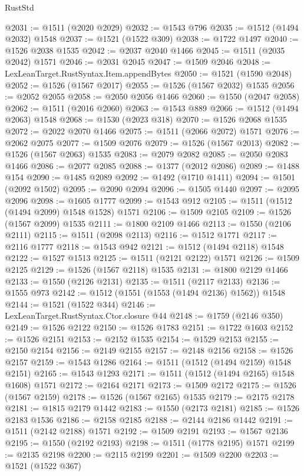 \begin{lexlean}{RustStd}
\begin{coremodule}
{{@2031 := @1511 (@2020 @2029)
@2032 := @1543 @796
@2035 := @1512 (@1494 @2032) @1548
@2037 := @1521 (@1522 @309)
@2038 := @1722 @1497
@2040 := @1526 @2038 @1535
@2042 := @2037 @2040 @1466
@2045 := @1511 (@2035 @2042) @1571
@2046 := @2031 @2045
@2047 := @1509 @2046
@2048 := LexLeanTarget.RustSyntax.Item.appendBytes
@2050 := @1521 (@1590 @2048)
@2052 := @1526 (@1567 @2017)
@2055 := @1526 (@1567 @2032) @1535
@2056 := @2052 @2055
@2058 := @2050 @2056 @1466
@2060 := @1550 (@2047 @2058)
@2062 := @1511 (@2016 @2060)
@2063 := @1543 @889
@2066 := @1512 (@1494 @2063) @1548
@2068 := @1530 (@2023 @318)
@2070 := @1526 @2068 @1535
@2072 := @2022 @2070 @1466
@2075 := @1511 (@2066 @2072) @1571
@2076 := @2062 @2075
@2077 := @1509 @2076
@2079 := @1526 (@1567 @2013)
@2082 := @1526 (@1567 @2063) @1535
@2083 := @2079 @2082
@2085 := @2050 @2083 @1466
@2086 := @2077 @2085
@2088 := @1377 (@2012 @2086)
@2089 := @1488 @154
@2090 := @1485 @2089
@2092 := @1492 (@1710 @1411)
@2094 := @1501 (@2092 @1502)
@2095 := @2090 @2094
@2096 := @1505 @1440
@2097 := @2095 @2096
@2098 := @1605 @1777
@2099 := @1543 @912
@2105 := @1511 (@1512 (@1494 @2099) @1548 @1528) @1571
@2106 := @1509 @2105
@2109 := @1526 (@1567 @2099) @1535
@2111 := @1800 @2109 @1466
@2113 := @1550 (@2106 @2111)
@2115 := @1511 (@2098 @2113)
@2116 := @1512 @1771
@2117 := @2116 @1777
@2118 := @1543 @942
@2121 := @1512 (@1494 @2118) @1548
@2122 := @1527 @1513
@2125 := @1511 (@2121 @2122) @1571
@2126 := @1509 @2125
@2129 := @1526 (@1567 @2118) @1535
@2131 := @1800 @2129 @1466
@2133 := @1550 (@2126 @2131)
@2135 := @1511 (@2117 @2133)
@2136 := @1555 @973
@2142 := @1512 (@1551 (@1553 (@1494 @2136) @1562)) @1548
@2144 := @1521 (@1522 @344)
@2146 := LexLeanTarget.RustSyntax.Ctor.closure @44
@2148 := @1759 (@2146 @350)
@2149 := @1526 @2122
@2150 := @1526 @1783
@2151 := @1722 @1603
@2152 := @1526 @2151
@2153 := @2152 @1535
@2154 := @1529 @2153
@2155 := @2150 @2154
@2156 := @2149 @2155
@2157 := @2148 @2156
@2158 := @1526 @2157
@2159 := @1543 @1286
@2164 := @1511 (@1512 (@1494 @2159) @1548 @2151)
@2165 := @1543 @1293
@2171 := @1511 (@1512 (@1494 @2165) @1548 @1608) @1571
@2172 := @2164 @2171
@2173 := @1509 @2172
@2175 := @1526 (@1567 @2159)
@2178 := @1526 (@1567 @2165) @1535
@2179 := @2175 @2178
@2181 := @1815 @2179 @1442
@2183 := @1550 (@2173 @2181)
@2185 := @1526 @2183 @1536
@2186 := @2158 @2185
@2188 := @2144 @2186 @1442
@2191 := @1511 (@2142 @2188) @1571
@2192 := @1509 @2191
@2193 := @1567 @2136
@2195 := @1550 (@2192 @2193)
@2198 := @1511 (@1778 @2195) @1571
@2199 := @2135 @2198
@2200 := @2115 @2199
@2201 := @1509 @2200
@2203 := @1521 (@1522 @367)
}}
\end{coremodule}
\end{lexlean}
